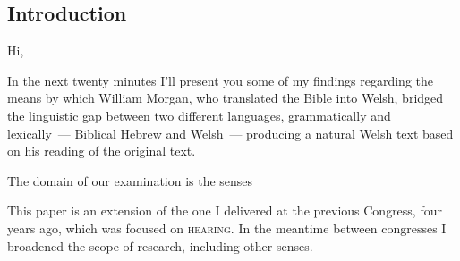 \begin{paper}
	\section{Introduction}

	Hi,

	In the next twenty minutes I’ll present you some of my findings regarding the means by which William Morgan, who translated the Bible into Welsh, bridged the linguistic gap between two different languages, grammatically and lexically~— Biblical Hebrew and Welsh~— producing a natural Welsh text based on his reading of the original text.

	The domain of our examination is the senses

	This paper is an extension of the one I delivered at the previous Congress, four years ago, which was focused on \textsc{hearing}. In the meantime between congresses I broadened the scope of research, including other senses.

\end{paper}
